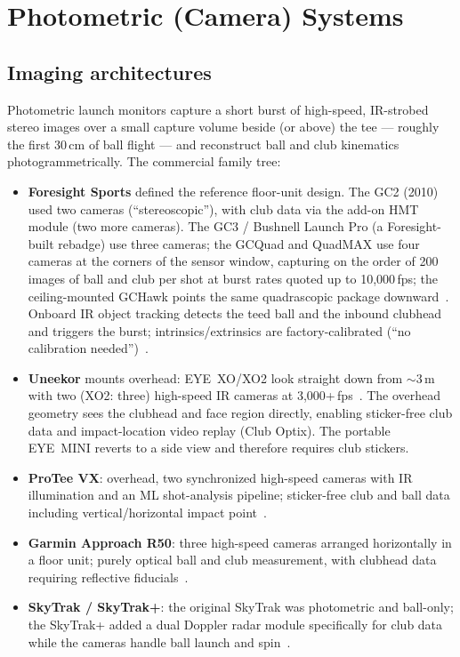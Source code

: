 \chapter{Photometric (Camera) Systems}
\label{ch:camera}

\section{Imaging architectures}
\label{sec:camarch}

Photometric launch monitors capture a short burst of high-speed, IR-strobed
stereo images over a small capture volume beside (or above) the tee ---
roughly the first 30\,cm of ball flight --- and reconstruct ball and club
kinematics photogrammetrically. The commercial family tree:

\begin{itemize}
\item \textbf{Foresight Sports} defined the reference floor-unit design.
The GC2 (2010) used two cameras (``stereoscopic''), with club data via the
add-on HMT module (two more cameras). The GC3 / Bushnell Launch Pro (a
Foresight-built rebadge) use three cameras; the GCQuad and QuadMAX use
four cameras at the corners of the sensor window, capturing on the order
of 200 images of ball and club per shot at burst rates quoted up to
10,000\,fps; the ceiling-mounted GCHawk points the same quadrascopic
package downward~\cite{foresightgcquad,playbetterblp}. Onboard IR object
tracking detects the teed ball and the inbound clubhead and triggers the
burst; intrinsics/extrinsics are factory-calibrated (``no calibration
needed'')~\cite{foresightgcquad}.
\item \textbf{Uneekor} mounts overhead: EYE~XO/XO2 look straight down from
$\sim$3\,m with two (XO2: three) high-speed IR cameras at
3,000+\,fps~\cite{uneekoreyexo}. The overhead geometry sees the clubhead
and face region directly, enabling sticker-free club data and
impact-location video replay (Club Optix). The portable EYE~MINI reverts
to a side view and therefore requires club stickers.
\item \textbf{ProTee VX}: overhead, two synchronized high-speed cameras
with IR illumination and an ML shot-analysis pipeline; sticker-free club
and ball data including vertical/horizontal impact
point~\cite{proteevx}.
\item \textbf{Garmin Approach R50}: three high-speed cameras arranged
horizontally in a floor unit; purely optical ball and club measurement,
with clubhead data requiring reflective fiducials~\cite{garminr50}.
\item \textbf{SkyTrak / SkyTrak+}: the original SkyTrak was photometric and
ball-only; the SkyTrak+ added a dual Doppler radar module specifically for
club data while the cameras handle ball launch and spin~\cite{skytrakplus}.
\end{itemize}

